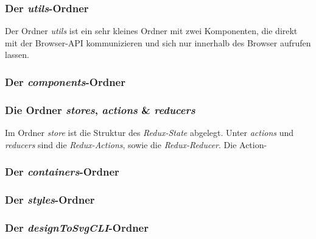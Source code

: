 \subsubsection{Der \textit{utils}-Ordner}
Der Ordner \textit{utils} ist ein sehr kleines Ordner mit zwei Komponenten, die direkt mit der Browser-API kommunizieren und sich nur innerhalb des Browser aufrufen lassen. 

\subsubsection{Der \textit{components}-Ordner}

\subsubsection{Die Ordner \textit{stores}, \textit{actions} \& \textit{reducers}}
Im Ordner \textit{store} ist die Struktur des \textit{Redux-State} abgelegt.  Unter \textit{actions} und \textit{reducers}  sind die \textit{Redux-Actions}, sowie die \textit{Redux-Reducer}. Die Action-


\subsubsection{Der \textit{containers}-Ordner}

\subsubsection{Der \textit{styles}-Ordner}

\subsubsection{Der \textit{designToSvgCLI}-Ordner}

